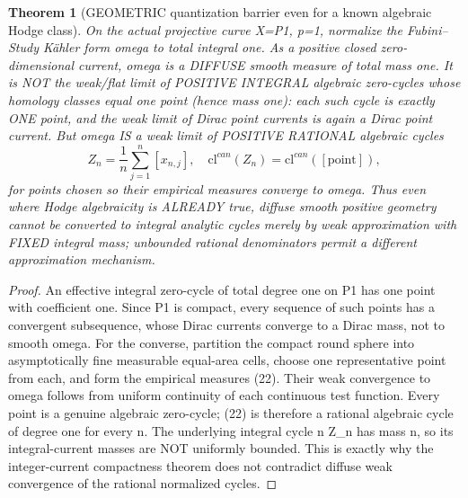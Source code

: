 \documentclass[11pt]{article}
\newtheorem{theorem}{Theorem}[section]
\begin{document}
\begin{theorem}[GEOMETRIC quantization barrier even for a known algebraic Hodge class]
On the actual projective
curve X=P1, p=1,
normalize the Fubini--Study
Kähler form omega
to total integral one.
As a positive closed
zero-dimensional current,
omega is a DIFFUSE smooth
measure of total mass one.
It is NOT the weak/flat
limit of POSITIVE INTEGRAL
algebraic zero-cycles whose
homology classes equal
one point (hence mass one):
each such cycle is exactly
ONE point, and the weak
limit of Dirac point
currents is again a
Dirac point current.
But omega IS a weak
limit of POSITIVE
RATIONAL algebraic cycles
\[
 \boxed{
  Z_n=\frac1n
     \sum_{j=1}^n [x_{n,j}],
  \quad
  \mathrm{cl}^{can}(Z_n)
     =\mathrm{cl}^{can}([\mathrm{point}]),
 }                                                     \tag{22}
\]
for points chosen so
their empirical measures
converge to omega.
Thus even where Hodge
algebraicity is ALREADY
true, diffuse smooth
positive geometry cannot
be converted to integral
analytic cycles merely
by weak approximation
with FIXED integral mass;
unbounded rational
denominators permit
a different approximation
mechanism.
\end{theorem}
\begin{proof}
An effective integral
zero-cycle of total
degree one on P1 has
one point with coefficient
one. Since P1 is
compact, every sequence
of such points has a
convergent subsequence,
whose Dirac currents
converge to a Dirac mass,
not to smooth omega.
For the converse,
partition the compact
round sphere into
asymptotically fine
measurable equal-area
cells, choose one
representative point
from each, and form
the empirical measures
(22). Their weak
convergence to omega
follows from uniform
continuity of each
continuous test function.
Every point is a
genuine algebraic
zero-cycle; (22) is
therefore a rational
algebraic cycle of
degree one for every n.
The underlying integral
cycle n Z_n has mass n,
so its integral-current
masses are NOT uniformly
bounded. This is exactly
why the integer-current
compactness theorem does
not contradict diffuse
weak convergence of the
rational normalized
cycles.
\end{proof}
\end{document}
